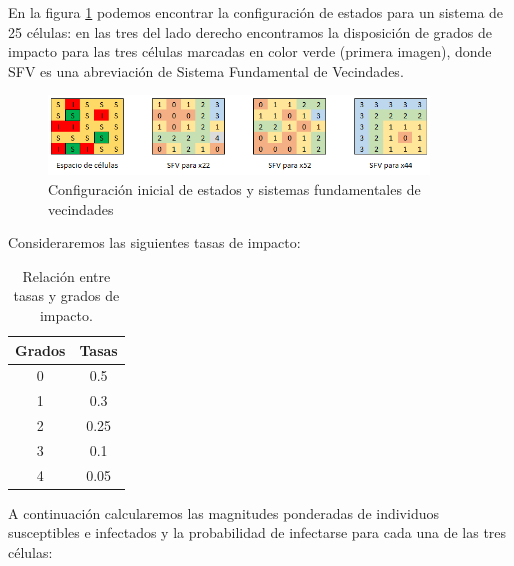 \begin{example}\label{ex:SIenAutómatasCelulares}
En la figura \ref{fig:configuraciónInicialEspacio25Celulas} podemos encontrar la configuración de estados para un sistema de 25 células: en las tres del lado derecho encontramos la disposición de grados de impacto para las tres células marcadas en color verde (primera imagen), donde SFV es una abreviación de Sistema Fundamental de Vecindades.


\begin{figure}[h]
  \centering
    \includegraphics[width=0.9\textwidth]{Imagenes/cellSpace.PNG}
    \caption{Configuración inicial de estados y sistemas fundamentales de vecindades}
    \label{fig:configuraciónInicialEspacio25Celulas}
\end{figure}

Consideraremos las siguientes tasas de impacto:

\begin{table}[h]
\begin{center}
\begin{tabular}{| c | c |}
\hline
Grados & Tasas \\ \hline
0 & 0.5 \\
1 & 0.3\\
2 & 0.25\\
3 & 0.1\\ 
4 & 0.05\\ \hline
\end{tabular}
\caption{Relación entre tasas y grados de impacto.}
\end{center}
\end{table}

A continuación calcularemos las magnitudes ponderadas de individuos susceptibles e infectados y la probabilidad de infectarse para cada una de las tres células:


\end{example}
